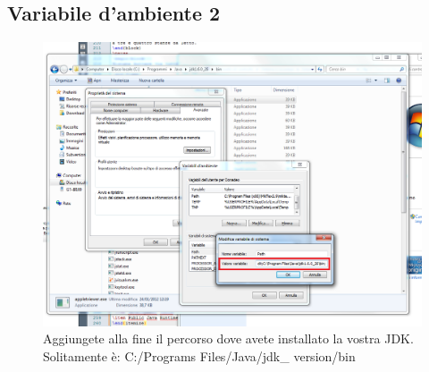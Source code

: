 \subsection*{Variabile d'ambiente 2}
\begin{frame}
\begin{figure}
\begin{center}
\includegraphics[scale=0.3]{images/path2.png}
\caption{\footnotesize{Aggiungete alla fine il percorso dove avete installato la vostra JDK. Solitamente è:
C:/Programs Files/Java/jdk\_ version/bin}}
\end{center}
\end{figure}
\end{frame}

